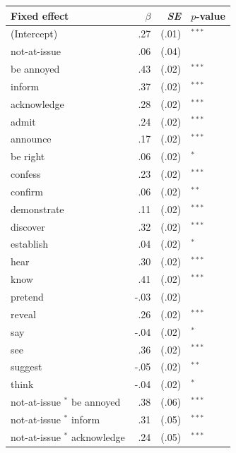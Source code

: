 \documentclass[11pt,fleqn]{article}
\newcommand{\6}{\mbox{$[\hspace*{-.6mm}[$}}
\newcommand{\9}{\mbox{$]\hspace*{-.6mm}]$}}
\begin{document}
\begin{table}
\begin{center}
\begin{tabular}{l r r l}
\toprule
Fixed effect & $\beta$ & {\em SE} & $p$-value \\ 
\midrule %


(Intercept)                   & .27   & (.01) & $^{***}$  \\
not-at-issue                           & .06    & (.04) &        \\
\midrule
  be annoyed      & .43    & (.02) & $^{***}$  \\
  inform          & .37    & (.02) & $^{***}$  \\
  acknowledge     & .28    & (.02) & $^{***}$  \\
  admit           & .24    & (.02) & $^{***}$  \\
  announce        & .17    & (.02) & $^{***}$  \\
  be right        & .06    & (.02) & $^{*}$    \\
  confess         & .23    & (.02) & $^{***}$  \\
  confirm         & .06    & (.02) & $^{**}$   \\
  demonstrate     & .11    & (.02) & $^{***}$  \\
  discover        & .32    & (.02) & $^{***}$  \\
  establish       & .04    & (.02) & $^{*}$    \\
  hear            & .30    & (.02) & $^{***}$  \\
  know            & .41    & (.02) & $^{***}$  \\
  pretend         & -.03    & (.02) &       \\
  reveal          & .26    & (.02) & $^{***}$  \\
  say             & -.04    & (.02) & $^{*}$   \\
  see             & .36    & (.02) & $^{***}$  \\
  suggest         & -.05    & (.02) & $^{**}$  \\
  think           & -.04   & (.02) & $^{*}$   \\
\midrule
not-at-issue $^*$  be annoyed  & .38    & (.06) & $^{***}$  \\
not-at-issue $^*$  inform      & .31    & (.05) & $^{***}$  \\
not-at-issue $^*$  acknowledge & .24    & (.05) & $^{***}$  \\

\end{tabular}
\end{center}
\end{table}
\end{document}
